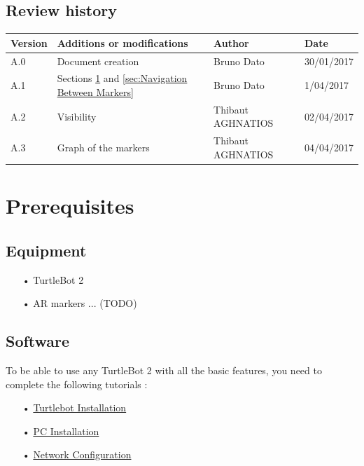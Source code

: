 \documentclass[10pt,a4paper]{article}
\begin{document}
\subsection*{Review history}

\begin{center}
    \begin{tabular}{| l | l | l | l |}
    \hline
     \rowcolor{gray} Version & Additions or modifications & Author & Date \\ \hline
    A.0 & Document creation & Bruno Dato & 30/01/2017\\ \hline
    A.1 & Sections \ref{sec:Prerequisites} and \ref{sec:Navigation Between Markers} & Bruno Dato & 1/04/2017\\ \hline
    A.2 & Visibility & Thibaut AGHNATIOS & 02/04/2017\\ \hline
    A.3 & Graph of the markers & Thibaut AGHNATIOS & 04/04/2017\\ \hline
     
    \end{tabular}
\end{center}

\newpage
\tableofcontents
\newpage
	

\section{Prerequisites}
\label{sec:Prerequisites}

\subsection{Equipment}

\begin{itemize}
\item[•] TurtleBot 2
\item[•] AR markers ... (TODO)
\end{itemize}

\subsection{Software}

To be able to use any TurtleBot 2 with all the basic features, you need to complete the following tutorials :

\begin{itemize}
\item[•] \href{http://wiki.ros.org/turtlebot/Tutorials/indigo/Turtlebot%20Installation}{Turtlebot Installation} 
\item[•] \href{http://wiki.ros.org/turtlebot/Tutorials/indigo/PC%20Installation}{PC Installation} 
\item[•] \href{http://wiki.ros.org/turtlebot/Tutorials/indigo/Network%20Configuration}{Network Configuration} 
\end{itemize}
\end{document}
